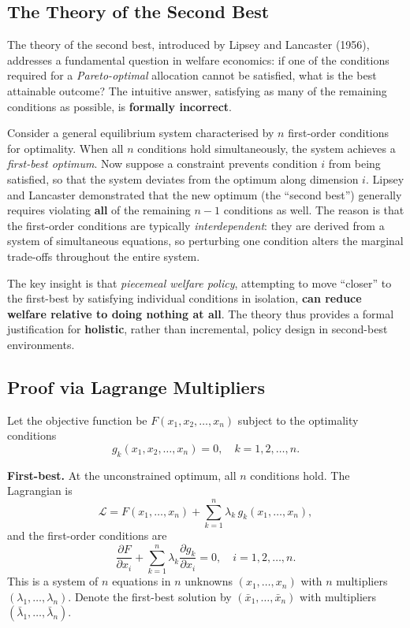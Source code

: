 \documentclass[11pt]{article}
\begin{document}
\subsection*{The Theory of the Second Best}

The theory of the second best, introduced by Lipsey and Lancaster (1956), addresses a fundamental question in welfare economics: if one of the conditions required for a \textit{Pareto-optimal} allocation cannot be satisfied, what is the best attainable outcome? The intuitive answer, satisfying as many of the remaining conditions as possible, is \textbf{formally incorrect}.

Consider a general equilibrium system characterised by \(n\) first-order conditions for optimality. When all \(n\) conditions hold simultaneously, the system achieves a \textit{first-best optimum}. Now suppose a constraint prevents condition \(i\) from being satisfied, so that the system deviates from the optimum along dimension \(i\). Lipsey and Lancaster demonstrated that the new optimum (the ``second best'') generally requires violating \textbf{all} of the remaining \(n - 1\) conditions as well. The reason is that the first-order conditions are typically \textit{interdependent}: they are derived from a system of simultaneous equations, so perturbing one condition alters the marginal trade-offs throughout the entire system.

The key insight is that \textit{piecemeal welfare policy}, attempting to move ``closer'' to the first-best by satisfying individual conditions in isolation, \textbf{can reduce welfare relative to doing nothing at all}. The theory thus provides a formal justification for \textbf{holistic}, rather than incremental, policy design in second-best environments.

\subsection*{Proof via Lagrange Multipliers}

Let the objective function be \(F(x_1, x_2, \ldots, x_n)\) subject to the optimality conditions
\[
  g_k(x_1, x_2, \ldots, x_n) = 0, \quad k = 1, 2, \ldots, n.
\]

\textbf{First-best.} At the unconstrained optimum, all \(n\) conditions hold. The Lagrangian is
\[
  \mathcal{L} = F(x_1, \ldots, x_n) + \sum_{k=1}^{n} \lambda_k \, g_k(x_1, \ldots, x_n),
\]
and the first-order conditions are
\[
  \frac{\partial F}{\partial x_i} + \sum_{k=1}^{n} \lambda_k \frac{\partial g_k}{\partial x_i} = 0, \quad i = 1, 2, \ldots, n. \tag{1}
\]
This is a system of \(n\) equations in \(n\) unknowns \((x_1, \ldots, x_n)\) with \(n\) multipliers \((\lambda_1, \ldots, \lambda_n)\). Denote the first-best solution by \((\bar{x}_1, \ldots, \bar{x}_n)\) with multipliers \((\bar{\lambda}_1, \ldots, \bar{\lambda}_n)\).
\end{document}
